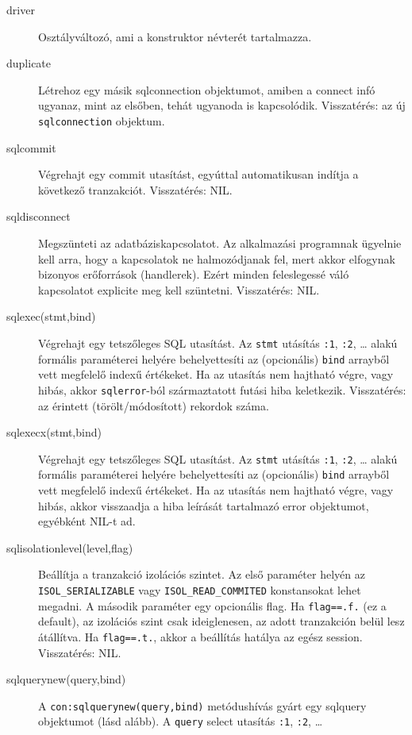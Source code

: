 \begin{description}
\item[driver]
    Osztályváltozó, ami a konstruktor névterét tartalmazza.
\item[duplicate]
    Létrehoz egy másik sqlconnection objektumot, 
    amiben a connect infó ugyanaz, mint az elsőben, 
    tehát ugyanoda is kapcsolódik.
    Visszatérés: az új \verb!sqlconnection! objektum.
\item[sqlcommit]
    Végrehajt egy commit utasítást, egyúttal
    automatikusan indítja a következő tranzakciót.
    Visszatérés: NIL.
\item[sqldisconnect]
    Megszünteti az adatbáziskapcsolatot. 
    Az alkalmazási programnak ügyelnie kell arra,
    hogy a kapcsolatok ne halmozódjanak fel,
    mert akkor elfogynak bizonyos erőforrások (handlerek).
    Ezért minden feleslegessé váló kapcsolatot explicite
    meg kell szüntetni.
    Visszatérés: NIL.
\item[sqlexec(stmt,bind)]
    Végrehajt egy tetszőleges SQL utasítást.
    Az \verb!stmt! utásítás \verb!:1!, \verb!:2!, \ldots
    alakú formális paraméterei helyére behelyettesíti
    az (opcionális) \verb!bind! arrayből vett megfelelő indexű értékeket.
    Ha az utasítás nem hajtható végre, vagy hibás,
    akkor \verb!sqlerror!-ból származtatott futási hiba keletkezik.
    Visszatérés: az érintett (törölt/módosított) rekordok száma.
\item[sqlexecx(stmt,bind)]
    Végrehajt egy tetszőleges SQL utasítást.
    Az \verb!stmt! utásítás \verb!:1!, \verb!:2!, \ldots
    alakú formális paraméterei helyére behelyettesíti
    az (opcionális) \verb!bind! arrayből vett megfelelő indexű értékeket.
    Ha az utasítás nem hajtható végre, vagy hibás,
    akkor visszaadja a hiba leírását tartalmazó error objektumot,
    egyébként NIL-t ad.
\item[sqlisolationlevel(level,flag)]
    Beállítja a tranzakció izolációs szintet.
    Az első paraméter helyén az \verb!ISOL_SERIALIZABLE!
    vagy \verb!ISOL_READ_COMMITED! konstansokat lehet megadni. 
    A második paraméter egy opcionális flag. 
    Ha \verb!flag==.f.! (ez a default),  az izolációs szint csak ideiglenesen, 
    az adott tranzakción belül lesz átállítva. 
    Ha \verb!flag==.t.!, akkor a beállítás hatálya az egész session.
    Visszatérés: NIL.
\item[sqlquerynew(query,bind)]
    A \verb!con:sqlquerynew(query,bind)! metódushívás
    gyárt egy sqlquery objektumot (lásd alább). 
    A \verb!query! select utasítás \verb!:1!, \verb!:2!, \ldots

\end{description}
